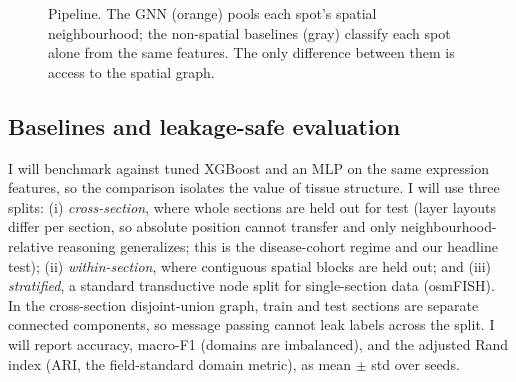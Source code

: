 \documentclass[11pt]{article}
\begin{document}
\begin{figure}[H]
\centering
{}
\caption{Pipeline. The GNN (orange) pools each spot's spatial neighbourhood; the
non-spatial baselines (gray) classify each spot alone from the same features. The
only difference between them is access to the spatial graph.}
\label{fig:pipeline}
\end{figure}

\subsection{Baselines and leakage-safe evaluation}
I will benchmark against tuned XGBoost and an MLP on the same expression features, so
the comparison isolates the value of tissue structure. I will use three splits:
(i) \emph{cross-section}, where whole sections are held out for test (layer
layouts differ per section, so absolute position cannot transfer and only
neighbourhood-relative reasoning generalizes; this is the disease-cohort regime
and our headline test); (ii) \emph{within-section}, where contiguous spatial
blocks are held out; and (iii) \emph{stratified}, a standard transductive node
split for single-section data (osmFISH). In the cross-section disjoint-union
graph, train and test sections are separate connected components, so message
passing cannot leak labels across the split. I will report accuracy, macro-F1
(domains are imbalanced), and the adjusted Rand index (ARI, the field-standard
domain metric), as mean $\pm$ std over seeds.
\end{document}
